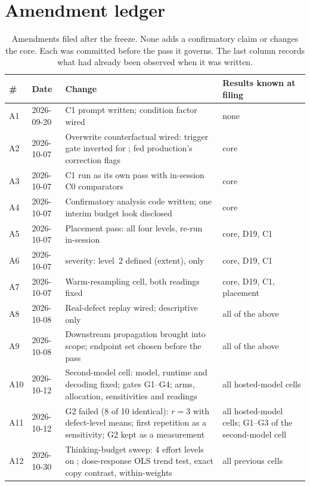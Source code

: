 \section{Amendment ledger}
\label{app:amendments}
\begin{table}[!htbp]
\setlength{\tabcolsep}{2pt}
\centering
\caption{Amendments filed after the freeze. None adds a confirmatory claim or
changes the core. Each was committed before the pass it governs. The last
column records what had already been observed when it was written.}
\label{tab:amendments}
\footnotesize
\begin{tabularx}{\linewidth}{@{}l l Y L{1.7cm}@{}}
\toprule
\# & Date & Change & Results known at filing \\
\midrule
A1 & 2026-09-20 & C1 prompt written; condition factor wired & none \\
A2 & 2026-10-07 & Overwrite counterfactual wired: trigger gate inverted for
  ;  fed production's correction flags & core \\
A3 & 2026-10-07 & C1 run as its own pass with in-session C0 comparators & core \\
A4 & 2026-10-07 & Confirmatory analysis code written; one interim budget look
  disclosed & core \\
A5 & 2026-10-07 & Placement pass: all four levels,  re-run in-session
  & core, D19, C1 \\
A6 & 2026-10-07 &  severity: level~2 defined (extent),  only &
  core, D19, C1 \\
A7 & 2026-10-07 & Warm-resampling cell, both readings fixed & core, D19, C1,
  placement \\
A8 & 2026-10-08 & Real-defect replay wired; descriptive only & all of the above
  \\
A9 & 2026-10-08 & Downstream propagation brought into scope; endpoint set
  chosen before the pass & all of the above \\
A10 & 2026-10-12 & Second-model cell: model, runtime and decoding fixed;
  gates G1--G4; arms, allocation, sensitivities and readings & all hosted-model
  cells \\
A11 & 2026-10-12 & G2 failed (8 of 10 identical): $r=3$ with defect-level
  means; first repetition as a sensitivity; G2 kept as a measurement & all
  hosted-model cells; G1--G3 of the second-model cell \\
A12 & 2026-10-30 & Thinking-budget sweep: 4 effort levels on \model{};
  dose-response OLS trend test, exact copy contrast, within-weights  &
  all previous cells \\
\bottomrule
\end{tabularx}
\end{table}


